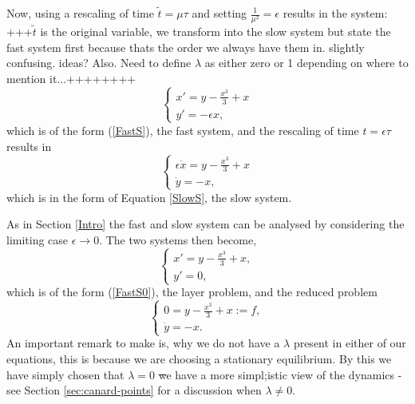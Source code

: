 Now, using a rescaling of time $ \tilde{t} = \mu \tau$ and setting $ \frac{1}{\mu^2} = \epsilon$ results in the system: \\
+++$ \tilde{t}$ is the original variable, we transform into the slow system but state the fast system first because thats the order we always have them in. slightly confusing. ideas? Also. Need to define $\lambda$ as either zero or 1 depending on where to mention it...++++++++
\begin{equation}\label{fastsystem}
\begin{cases} x'=y-\frac{x^3}{3}+x\\
y'=-\epsilon x,
\end{cases}
\end{equation}
which is of the form (\ref{FastS}), the fast system, and the rescaling of time $t= \epsilon \tau$ results in 
\begin{equation}\label{slowsystem}
\begin{cases} \epsilon \dot{x}=y-\frac{x^3}{3}+x\\
\dot{y}=-x,
\end{cases}
\end{equation}
which is in the form of Equation \ref{SlowS}, the slow system. 

As in Section \ref{Intro} the fast and slow system can be analysed by considering the limiting case $\epsilon \to 0$. The two systems then become,
\begin{equation}\label{fastsystem0}
\begin{cases} x'=y-\frac{x^3}{3}+x,\\
y'=0,
\end{cases}
\end{equation}
which is of the form (\ref{FastS0}), the layer problem, and the reduced problem 
\begin{equation}\label{slowsystem0}
\begin{cases} 0=y-\frac{x^3}{3}+x:=f,\\
\dot{y}=-x.
\end{cases}
\end{equation}
An important remark to make is, why we do not have a $ \lambda $ present in either of our equations, this is because we are choosing a stationary equilibrium. By this we have simply chosen that $ \lambda=0 $ \st we have a more simpl;istic view of the dynamics - see Section \ref{sec:canard-points} for a discussion when $ \lambda\neq0. $


